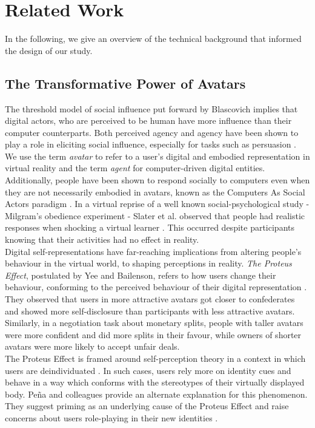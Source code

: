 \section{Related Work}
In the following, we give an overview of the technical background that informed the design of our study. 

\subsection{The Transformative Power of Avatars}
The threshold model of social influence put forward by Blascovich \cite{blascovich2002theoretical} implies that digital actors, who are perceived to be human have more influence than their computer counterparts. Both perceived agency and agency have been shown to play a role in eliciting social influence, especially for tasks such as persuasion \cite{guadagno2007virtual,fox2015avatars}. 
We use the term \textit{avatar} to refer to a user’s digital and embodied representation in virtual reality and the term \textit{agent} for computer-driven digital entities. Additionally, people have been shown to respond socially to computers even when they are not necessarily embodied in avatars, known as the Computers As Social Actors paradigm \cite{nass1994computers}. 
In a virtual reprise of a well known social-psychological study - Milgram’s obedience experiment - Slater et al. observed that people had realistic responses when shocking a virtual learner \cite{slater2006virtual}.
This occurred despite participants knowing that their activities had no effect in reality.\\
Digital self-representations have far-reaching implications from altering people's behaviour in the virtual world, to shaping perceptions in reality.
\textit{The Proteus Effect}, postulated by Yee and Bailenson, refers to how users change their behaviour, conforming to the perceived behaviour of their digital representation \cite{yee2007proteus}. 
 They observed that users in more attractive avatars got closer to confederates and showed more self-disclosure than participants with less attractive avatars. Similarly, in a negotiation task about monetary splits, people with taller avatars were more confident and did more splits in their favour, while owners of shorter avatars were more likely to accept unfair deals. \\
The Proteus Effect is framed around self-perception theory \cite{bem1972self} in a context in which users are deindividuated \cite{zimbardo1969human}. In such cases, users rely more on identity cues and behave in a way which conforms with the stereotypes of their virtually displayed body. Peña and colleagues provide an alternate explanation for this phenomenon. They suggest priming as an underlying cause of the Proteus Effect and raise concerns about users role-playing in their new identities \cite{pena2009priming}.
